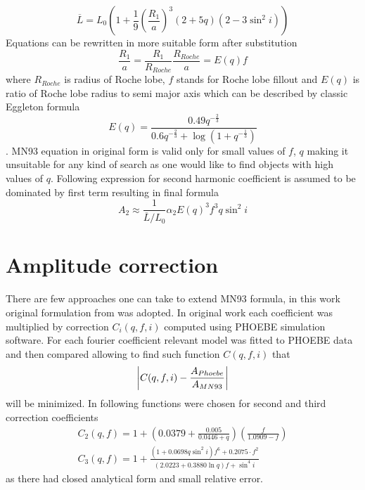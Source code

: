 \documentclass{pracalicmgr}
\begin{document}
\begin{equation}
    \overline{L}=L_0\left(1+\frac{1}{9}\left(\frac{R_1}{a}\right)^3(2+5q)(2-3\sin^2{i})\right)
\end{equation}
Equations can be rewritten in more suitable form after substitution
$$\frac{R_1}{a}=\frac{R_1}{R_{Roche}}\frac{R_{Roche}}{a}=E(q)f$$ 
where $R_{Roche}$ 
is radius of Roche lobe, $f$ stands for Roche lobe fillout and $E(q)$ is ratio of Roche lobe radius to semi major axis which can be described by classic Eggleton formula 
\citep{eggleton_approximations_1983}
\begin{equation}
    E(q)=\frac{0.49q^{-\frac{2}{3}}}{0.6q^{-\frac{2}{3}}+\log{(1+q^{-\frac{1}{3}})}}
\end{equation}. 
MN93 equation in original form is valid only for small values of $f$, $q$ making it unsuitable for any kind of search as one would like to find objects with high values of $q$.
Following \citep{gomel_search_2021-1} expression for second harmonic coefficient is assumed to be dominated by first term resulting in final formula 
\begin{equation}
    A_2\approx \frac{1}{\overline{L}/L_0} \alpha_2 E(q)^3 f^3 q \sin^2{i}
\end{equation}
\section{Amplitude correction}
There are few approaches one can take to extend MN93 formula, in this work original formulation from \citep{gomel_search_2021} was adopted.
In original work each coefficient was multiplied by correction $C_i(q,f,i)$ computed using PHOEBE simulation software. For each
fourier coefficient relevant model was fitted to PHOEBE data and then compared allowing to find such function $C(q,f,i)$ that 
\begin{equation}
    \abs{C(q,f,i)-\frac{A_{Phoebe}}{A_{MN93}}}
\end{equation}
will be minimized. In \cite{gomel_search_2021} following functions were chosen for second and third correction coefficients
\begin{align}
    C_2(q,f)=1+\left(0.0379+\frac{0.005}{0.0446+q}\right)\left(\frac{f}{1.0909-f}\right)\\
    C_3(q,f)=1+\frac{(1+0.0698q\sin^2{i})f^6+0.2075\cdot f^2}{(2.0223+0.3880\ln{q})f+\sin^4{i}}
\end{align}
as there had closed analytical form and small relative error. 
\end{document}
